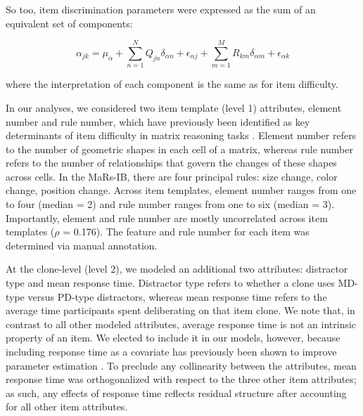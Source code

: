 \documentclass[a4paper,man,natbib]{apa6}
\begin{document}
\noindent So too, item discrimination parameters were expressed as the sum of an equivalent set of components:

\begin{equation}
\alpha_{jk} = \mu_\alpha + \sum_{n=1}^N Q_{jn} \delta_{\alpha n} + \epsilon_{\alpha j} + \sum_{m=1}^M R_{km} \delta_{\alpha m} + \epsilon_{\alpha k}
\end{equation}

\noindent where the interpretation of each component is the same as for item difficulty.

In our analyses, we considered two item template (level 1) attributes, element number and rule number, which have previously been identified as key determinants of item difficulty in matrix reasoning tasks \citep{primi2001complexity}. Element number refers to the number of geometric shapes in each cell of a matrix, whereas rule number refers to the number of relationships that govern the changes of these shapes across cells. In the MaRs-IB, there are four principal rules: size change, color change, position change. Across item templates, element number ranges from one to four (median = 2) and rule number ranges from one to six (median = 3). Importantly, element and rule number are mostly uncorrelated across item templates ($\rho$ = 0.176). The feature and rule number for each item was determined via manual annotation.  

At the clone-level (level 2), we modeled an additional two attributes: distractor type and mean response time. Distractor type refers to whether a clone uses MD-type versus PD-type distractors, whereas mean response time refers to the average time participants spent deliberating on that item clone. We note that, in contrast to all other modeled attributes, average response time is not an intrinsic property of an item. We elected to include it in our models, however, because including response time as a covariate has previously been shown to improve parameter estimation \citep{bertling2018using}. To preclude any collinearity between the attributes, mean response time was orthogonalized with respect to the three other item attributes; as such, any effects of response time reflects residual structure after accounting for all other item attributes.
\end{document}
